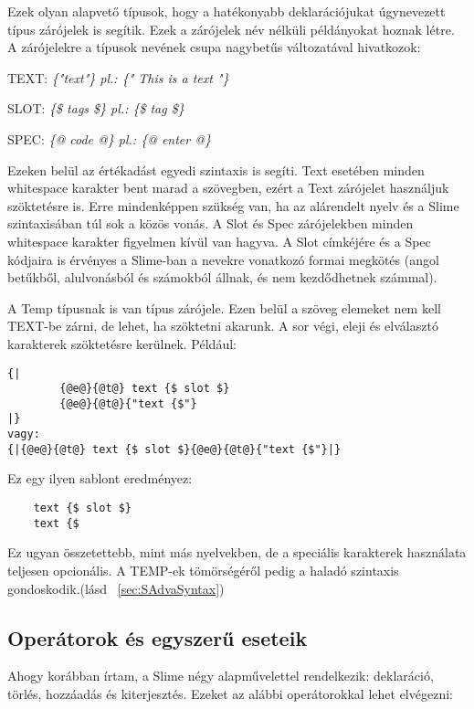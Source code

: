 Ezek olyan alapvető típusok, hogy a hatékonyabb deklarációjukat úgynevezett típus zárójelek is segítik. 
Ezek a zárójelek név nélküli példányokat hoznak létre.
A zárójelekre a típusok nevének csupa nagybetűs változatával hivatkozok:

TEXT: \textit{\{"text"\} pl.: \{" This is a text "\}}

SLOT: \textit{\{\$ tags \$\} pl.: \{\$ tag \$\}}

SPEC: \textit{\{@ code @\} pl.: \{@ enter @\}}

Ezeken belül az értékadást egyedi szintaxis is segíti.
Text esetében minden whitespace karakter bent marad a szövegben, ezért a Text zárójelet használjuk szöktetésre is.
Erre mindenképpen szükség van, ha az alárendelt nyelv és a Slime szintaxisában túl sok a közös vonás.
A Slot és Spec zárójelekben minden whitespace karakter figyelmen kívül van hagyva.
A Slot címkéjére és a Spec kódjaira is érvényes a Slime-ban a nevekre vonatkozó formai megkötés (angol betűkből, alulvonásból és számokból állnak, és nem kezdődhetnek számmal).

A Temp típusnak is van típus zárójele. 
Ezen belül a szöveg elemeket nem kell TEXT-be zárni, de lehet, ha szöktetni akarunk. 
A sor végi, eleji és elválasztó karakterek szöktetésre kerülnek. Például:\begin{verbatim}
{| 
		{@e@}{@t@} text {$ slot $} 
		{@e@}{@t@}{"text {$"}
|}
vagy:
{|{@e@}{@t@} text {$ slot $}{@e@}{@t@}{"text {$"}|}
\end{verbatim}Ez egy ilyen sablont eredményez:

\begin{verbatim}
    text {$ slot $}
    text {$ 
\end{verbatim}

Ez ugyan összetettebb, mint más nyelvekben, de a speciális karakterek használata teljesen opcionális.
A TEMP-ek tömörségéről pedig a haladó szintaxis gondoskodik.(lásd ~\ref{sec:SAdvaSyntax})


\subsection{Operátorok és egyszerű eseteik}
\label{sec:SOper}
Ahogy korábban írtam, a Slime négy alapművelettel rendelkezik: deklaráció, törlés, hozzáadás és kiterjesztés. 
Ezeket az alábbi operátorokkal lehet elvégezni:

